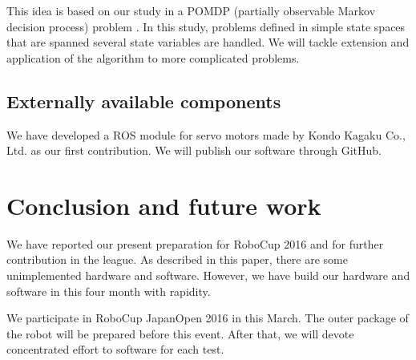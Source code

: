 \documentclass{llncs}
\begin{document}
This idea is based on our study in a POMDP
(partially observable Markov decision process) problem
\cite{ueda2015}. In this study, problems defined in
simple state spaces that are spanned several state variables
are handled. We will tackle extension and application of
the algorithm to more complicated problems.


\subsection{Externally available components}

We have developed a ROS module for servo motors made
by Kondo Kagaku Co., Ltd.
as our first contribution\cite{hayashibara_kondo}.
We will publish our software through GitHub.

\section{Conclusion and future work}\label{sec:conclusion}

We have reported our present preparation for
RoboCup 2016 and for further contribution in the league.
As described in this paper, there are some unimplemented
hardware and software. However, we have build our hardware
and software in this four month with rapidity.

We participate in RoboCup JapanOpen 2016 in this March.
The outer package of the robot will be prepared before
this event. After that, we will devote concentrated effort
to software for each test.





\end{document}
